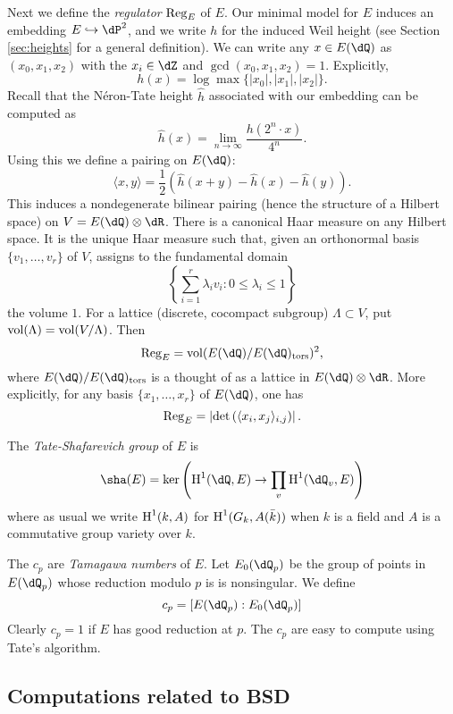 Next we define the \emph{regulator} $\operatorname{Reg}_E$ of $E$. Our minimal model 
for $E$ induces an embedding $E\hookrightarrow \dP^2$, and we write $h$ for 
the induced Weil height (see Section \ref{sec:heights} for a general 
definition). We can write any $x\in E(\dQ)$ as $(x_0,x_1,x_2)$ with the 
$x_i\in \dZ$ and $\gcd(x_0,x_1,x_2)=1$. Explicitly, 
\[
  h(x) = \log \max\{|x_0|,|x_1|,|x_2|\} \text{.}
\]
Recall that the N\'eron-Tate height $\widehat h$ associated with our embedding 
can be computed as 
\[
  \widehat h(x) = \lim_{n\to \infty} \frac{h(2^n\cdot x)}{4^n} \text{.}
\]
Using this we define a pairing on $E(\dQ)$:
\[
  \langle x,y\rangle = \frac 1 2\left(\widehat h(x+y)-\widehat h(x)-\widehat h(y)\right) \text{.}
\]
This induces a nondegenerate bilinear pairing (hence the structure of a 
Hilbert space) on $V=E(\dQ)\otimes \dR$. There is a canonical Haar measure 
on any Hilbert space. It is the unique Haar measure such that, given an 
orthonormal basis $\{v_1,\dots,v_r\}$ of $V$, assigns to the fundamental 
domain 
\[
  \left\{\sum_{i=1}^r  \lambda_i v_i : 0\leqslant \lambda_i \leqslant 1\right\}
\]
the volume $1$. For a lattice (discrete, cocompact subgroup) 
$\Lambda\subset V$, put $\operatorname{vol}(\Lambda)=\operatorname{vol}(V/\Lambda)$. Then 
\[
  \regulator_E = \volume(E(\dQ)/E(\dQ)_\text{tors})^2 \text{,}
\]
where $E(\dQ)/E(\dQ)_\text{tors}$ is a thought of as a lattice in 
$E(\dQ)\otimes \dR$. More explicitly, for any basis 
$\{x_1,\dots,x_r\}$ of $E(\dQ)$, one has 
\[
  \operatorname{Reg}_E = \left|\det\left(\langle x_i,x_j\rangle_{i,j}\right) \right| \text{.}
\]

The \emph{Tate-Shafarevich group} of $E$ is 
\[
  \sha(E) = \ker\left(\h^1(\dQ,E) \to \prod_v \h^1(\dQ_v,E)\right)
\]
where as usual we write $\operatorname{H}^1(k,A)$ for $\operatorname{H}^1(G_k,A(\bar k))$ when $k$ is a 
field and $A$ is a commutative group variety over $k$. 

The $c_p$ are \emph{Tamagawa numbers} of $E$. Let $E_0(\dQ_p)$ be the group of 
points in $E(\dQ_p)$ whose reduction modulo $p$ is is nonsingular. We define 
\[
  c_p=[E(\dQ_p):E_0(\dQ_p)]
\]
Clearly $c_p=1$ if $E$ has good reduction at $p$. The $c_p$ are easy to compute 
using Tate's algorithm. 










\subsection{Computations related to BSD}


